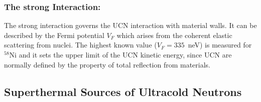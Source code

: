  \subsubsection{The strong Interaction:} The strong interaction governs the
 UCN interaction with material walls. It can be described by the Fermi
 potential $V_F$ which arises from the coherent elastic scattering
 from nuclei. The highest known value ($V_F=335$~neV) is measured for
 $^{58}$Ni and it sets the upper limit of the UCN kinetic energy,
 since UCN are normally defined by the property of total reflection
 from materials.

 \subsection{Superthermal Sources of Ultracold Neutrons}
\label{sec:ucn_with_heII}
 


    




  
  


  

